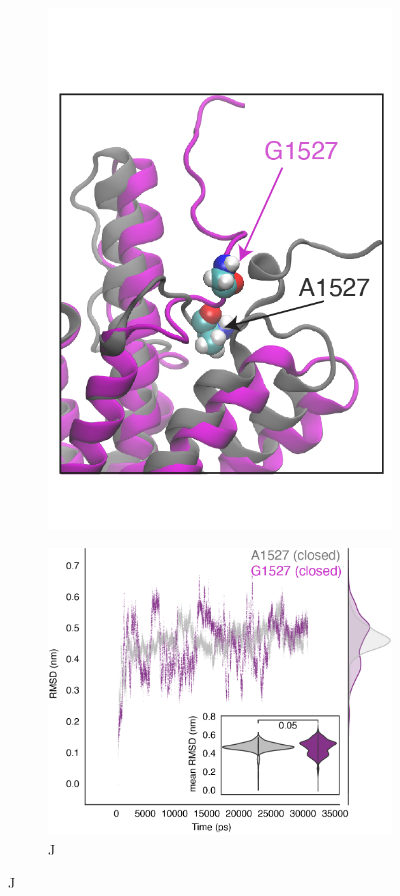 \begin{figure}[H]
\begin{subfigure}[t]{0.165\textwidth}
        \includegraphics[width=\textwidth]{./main_plots/abca7_inset_only.png}        
    \end{subfigure}
    \hspace{0.01\textwidth} %
    \begin{subfigure}[t]{0.32\textwidth}
        \caption{J}
        \includegraphics[width=\textwidth]{./main_plots/variant_dynamics.png}        

\end{subfigure}
\end{figure}
